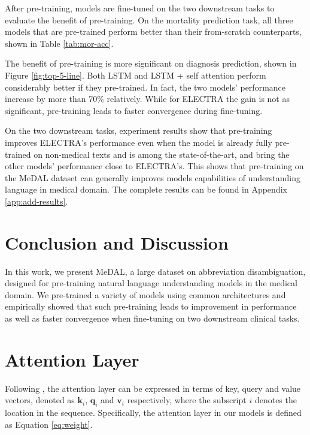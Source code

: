 \documentclass[11pt,a4paper]{article}
\begin{document}
After pre-training, models are fine-tuned on the two downstream tasks to evaluate the benefit of pre-training. On the mortality prediction task, all three models that are pre-trained perform better than their from-scratch counterparts, shown in Table \ref{tab:mor-acc}.

The benefit of pre-training is more significant on diagnosis prediction, shown in Figure \ref{fig:top-5-line}. Both LSTM and LSTM + self attention perform considerably better if they pre-trained. In fact, the two models' performance increase by more than 70\% relatively. While for ELECTRA the gain is not as significant, pre-training leads to faster convergence during fine-tuning.

On the two downstream tasks, experiment results show that pre-training improves ELECTRA's performance even when the model is already fully pre-trained on non-medical texts and is among the state-of-the-art, and bring the other models' performance close to ELECTRA's. This shows that pre-training on the MeDAL dataset can generally improves models capabilities of understanding language in medical domain. The complete results can be found in Appendix \ref{app:add-results}.

\section{Conclusion and Discussion}

In this work, we present MeDAL, a large dataset on abbreviation disambiguation, designed for pre-training natural language understanding models in the medical domain. We pre-trained a variety of models using common architectures and empirically showed that such pre-training leads to improvement in performance as well as faster convergence when fine-tuning on two downstream clinical tasks.




\newpage

\appendix

\cleardoublepage
\balance

\section{Attention Layer}\label{app:attention}

Following \citet{Vaswani2017}, the attention layer can be expressed in terms of key, query and value vectors, denoted as $\mathbf{k}_i$, $\mathbf{q}_i$ and $\mathbf{v}_i$ respectively, where the subscript $i$ denotes the location in the sequence. Specifically, the attention layer in our models is defined as Equation \ref{eq:weight}.
\end{document}
